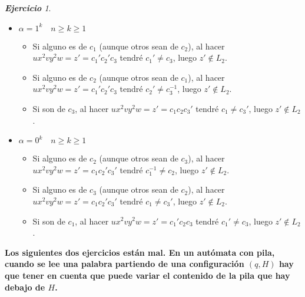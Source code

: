 \documentclass[12pt,spanish]{article}
\theoremstyle{definition}
\theoremstyle{remark}
\newtheorem{exercise}{\textbf{Ejercicio}}%
\begin{document}
\begin{exercise}
\begin{itemize}
  \item $\alpha = 1^k \quad n \geq k\geq 1$
    \begin{itemize}
    \item Si alguno es de $c_1$ (aunque otros sean de $c_2$), al hacer
      $ux^2vy^2w=z'=c_1'c_2'c_3$ tendré $c_1'\neq c_3$, luego
      $z' \notin L_2$.
    \item Si alguno es de $c_2$ (aunque otros sean de $c_1$), al hacer
      $ux^2vy^2w=z'=c_1'c_2'c_3$ tendré $c_2'\neq c_3^{-1}$, luego
      $z' \notin L_2$.
    \item Si son de $c_3$, al hacer $ux^2vy^2w=z'=c_1c_2c_3'$ tendré
      $c_1\neq c_3'$, luego $z' \notin L_2$.
    \end{itemize}

    \item $\alpha = 0^k \quad n \geq k\geq 1$
    \begin{itemize}
    \item Si alguno es de $c_2$ (aunque otros sean de $c_3$), al hacer
      $ux^2vy^2w=z'=c_1c_2'c_3'$ tendré $c_1^{-1}\neq c_2$, luego
      $z' \notin L_2$.
    \item Si alguno es de $c_3$ (aunque otros sean de $c_2$), al hacer
      $ux^2vy^2w=z'=c_1c_2'c_3'$ tendré $c_1\neq c_3'$, luego
      $z' \notin L_2$.
    \item Si son de $c_1$, al hacer $ux^2vy^2w=z'=c_1'c_2c_3$ tendré
      $c_1'\neq c_3$, luego $z' \notin L_2$.
    \end{itemize}
  \end{itemize}
\end{exercise}

\newpage

\textbf{Los siguientes dos ejercicios están mal. En un autómata con
  pila, cuando se lee una palabra partiendo de una configuración
  $(q,H)$ hay que tener en cuenta que puede variar el contenido de la
  pila que hay debajo de $H$.}\\

\setcounter{exercise}{20}
\end{document}
